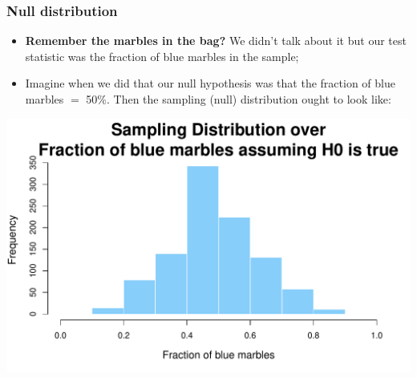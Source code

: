 \documentclass[aspectratio=169]{beamer}
\theoremstyle{principle}
\begin{document}
\begin{frame}
\frametitle{Null distribution}
  
\begin{itemize}
\item \textbf{Remember the marbles in the bag?}  We didn't talk about it but our test statistic was the fraction of blue marbles in the sample;
\bigskip

\item Imagine when we did that our null hypothesis was that the fraction of blue marbles $=$ 50\%.  Then the sampling (null) distribution ought to look like:
\end{itemize}

\begin{center}
\includegraphics[scale=0.4]{null_05.pdf}
\end{center}

\end{frame}
\end{document}
